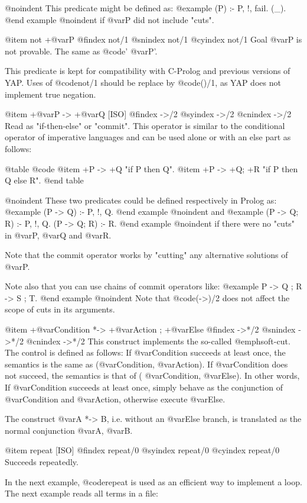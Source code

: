 {{{{@noindent
This predicate might be defined as:
@example
 \+(P) :- P, !, fail.
 \+(_).
@end example
@noindent
if @var{P} did not include "cuts".

@item not +@var{P}
@findex not/1
@snindex not/1
@cyindex not/1
Goal @var{P} is not provable. The same as @code{'\+ @var{P}'}.

This predicate is kept for compatibility with C-Prolog and previous
versions of YAP. Uses of @code{not/1} should be replace by
@code{(\+)/1}, as YAP does not implement true negation.

@item  +@var{P} -> +@var{Q} [ISO]
@findex ->/2
@syindex ->/2
@cnindex ->/2
Read as "if-then-else" or "commit". This operator is similar to the
conditional operator of imperative languages and can be used alone or
with an else part as follows:

@table @code
@item +P -> +Q
"if P then Q".
@item +P -> +Q; +R
"if P then Q else R".
@end table

@noindent
These two predicates could be defined respectively in Prolog as:
@example
 (P -> Q) :- P, !, Q.
@end example
@noindent
and
@example
 (P -> Q; R) :- P, !, Q.
 (P -> Q; R) :- R.
@end example
@noindent
if there were no "cuts" in @var{P}, @var{Q} and @var{R}.

Note that the commit operator works by "cutting" any alternative
solutions of @var{P}.

Note also that you can use chains of commit operators like:
@example
    P -> Q ; R -> S ; T.
@end example
@noindent
Note that @code{(->)/2} does not affect the scope of cuts in its
arguments.

@item  +@var{Condition} *-> +@var{Action} ; +@var{Else}
@findex ->*/2
@snindex ->*/2
@cnindex ->*/2
This construct implements the so-called @emph{soft-cut}. The control is
    defined as follows: If @var{Condition} succeeds at least once, the
    semantics is the same as (@var{Condition}, @var{Action}). If
    @var{Condition} does not succeed, the semantics is that of (\+
    @var{Condition}, @var{Else}). In other words, If @var{Condition}
    succeeds at least once, simply behave as the conjunction of
    @var{Condition} and @var{Action}, otherwise execute @var{Else}.

    The construct @var{A *-> B}, i.e. without an @var{Else} branch, is
translated as the normal conjunction @var{A}, @var{B}.

@item repeat [ISO]
@findex repeat/0
@syindex repeat/0
@cyindex repeat/0
Succeeds repeatedly.
 
In the next example, @code{repeat} is used as an efficient way to implement
a loop. The next example reads all terms in a file:

}}}}
